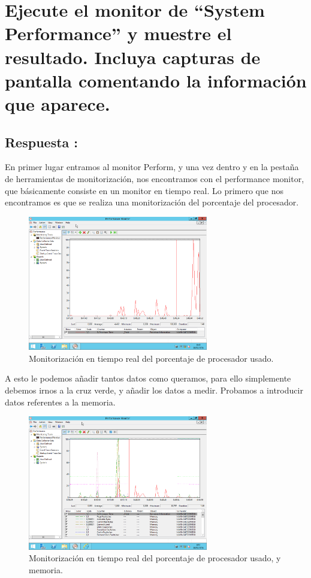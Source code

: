 \section{Ejecute el monitor de ``System Performance'' y muestre el resultado. Incluya capturas de pantalla comentando la información que aparece.}
\subsection{Respuesta : }

En primer lugar entramos al monitor Perform, y una vez dentro y en la pestaña de herramientas de monitorización, nos encontramos con el performance monitor, que básicamente consiste en un monitor en tiempo real. Lo primero que nos encontramos es que se realiza una monitorización del porcentaje del procesador. \newline

\begin{figure}[H]
	\begin{center}
		\includegraphics[width=0.7\textwidth]{Imagenes/Monitorizacion_cpu}
		\caption{Monitorización en tiempo real del porcentaje de procesador usado.} \label{fig:40}
	\end{center}
\end{figure}

A esto le podemos añadir tantos datos como queramos, para ello simplemente debemos irnos a la cruz verde, y añadir los datos a medir. Probamos a introducir datos referentes a la memoria.

\begin{figure}[H]
	\begin{center}
		\includegraphics[width=0.7\textwidth]{Imagenes/Monitorizacion_cpu_y_memoria}
		\caption{Monitorización en tiempo real del porcentaje de procesador usado, y memoria.} \label{fig:41}
	\end{center}
\end{figure}

